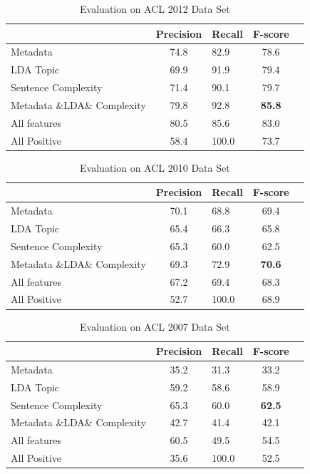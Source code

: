 \documentclass[11pt,letterpaper]{article}
\begin{document}
\begin{table}
\begin{center}
\begin{tabular}{|p{2cm}|cl|c|c|}
\hline 
& \bf Precision & \bf Recall & \bf F-score \\ \hline
Metadata	& 74.8	& 82.9	& 78.6\\ \hline
LDA Topic &	69.9	&91.9&	79.4\\ \hline
Sentence Complexity	& 71.4	& 90.1 &	79.7\\ \hline
Metadata \&LDA\& Complexity	& 79.8	& 92.8 & \bf 85.8\\ \hline
All features	& 80.5	& 85.6	& 83.0\\ \hline
All Positive	& 58.4	& 100.0	& 73.7\\\hline
\end{tabular}
\end{center}
\label{tab:2012}
\caption{Evaluation on ACL 2012 Data Set}
\end{table}


\begin{table}
\begin{center}
\begin{tabular}{|p{2cm}|cl|c|c|}
\hline 
& \bf Precision & \bf Recall & \bf F-score \\ \hline
Metadata	&70.1&68.8&69.4\\ \hline
LDA Topic &65.4&66.3&65.8\\ \hline
Sentence Complexity	&65.3&60.0&62.5\\ \hline
Metadata \&LDA\& Complexity	&69.3&72.9&\bf 70.6\\ \hline
All features	&67.2&69.4&68.3\\ \hline
All Positive	&52.7& 100.0	& 68.9\\\hline
\end{tabular}
\end{center}
\label{tab:2010}
\caption{Evaluation on ACL 2010 Data Set}
\end{table}

\begin{table}
\begin{center}
\begin{tabular}{|p{2cm}|cl|c|c|}
\hline 
& \bf Precision & \bf Recall & \bf F-score \\ \hline
Metadata	& 35.2	& 31.3	& 33.2\\ \hline
LDA Topic &	59.2	& 58.6&	58.9\\ \hline
Sentence Complexity	& 65.3	& 60.0 &	\bf 62.5\\ \hline
Metadata \&LDA\& Complexity	& 42.7	& 41.4 & 42.1\\ \hline
All features	& 60.5	& 49.5	& 54.5 \\ \hline
All Positive	& 35.6	& 100.0	& 52.5\\ \hline
\end{tabular}
\end{center}
\label{tab:2007}
\caption{Evaluation on ACL 2007 Data Set}
\end{table}
\end{document}
